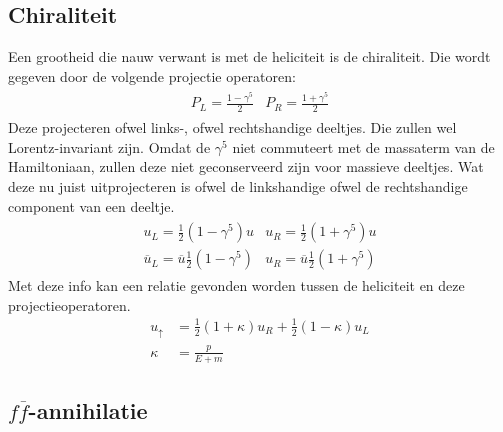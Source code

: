 \documentclass[../main.tex]{subfiles}
\begin{document}
\subsection{Chiraliteit}%
\label{sub:chiraliteit}

Een grootheid die nauw verwant is met de heliciteit is de chiraliteit. Die wordt gegeven door de volgende projectie operatoren:
\begin{equation}
    \begin{aligned}
        \label{eq:chiraliteit_operatoren}
        \begin{matrix}
            P_L = \frac{1-\gamma^5}{2} & P_R = \frac{1+\gamma^5}{2}
        \end{matrix}
    \end{aligned}
\end{equation}
Deze projecteren ofwel links-, ofwel rechtshandige deeltjes. Die zullen wel Lorentz-invariant zijn. Omdat de $\gamma^5$ niet commuteert met de massaterm van de Hamiltoniaan, zullen deze niet geconserveerd zijn voor massieve deeltjes. Wat deze nu juist uitprojecteren is ofwel de linkshandige ofwel de rechtshandige component van een deeltje.
\begin{equation}
    \begin{aligned}
        \label{eq:proj_deeltjes}
        \begin{matrix}
            u_L = \frac{1}{2} (1-\gamma^5)u & u_R = \frac{1}{2} (1+\gamma^5)u\\
            \overline u_L = \overline u\frac{1}{2} (1-\gamma^5) & u_R = \overline u\frac{1}{2} (1+\gamma^5)
        \end{matrix}
    \end{aligned}
\end{equation}
Met deze info kan een relatie gevonden worden tussen de heliciteit en deze projectieoperatoren.
\begin{equation}
    \begin{aligned}
        \label{eq:hel_chir}
        u_\uparrow &= \frac{1}{2} (1+\kappa)u_R + \frac{1}{2} (1-\kappa)u_L\\
        \kappa &= \frac{p}{E+m} 
    \end{aligned}
\end{equation}

\subsection{$f\overline f$-annihilatie}%
\label{sub:_foverline_f_annihilatie}
\end{document}
